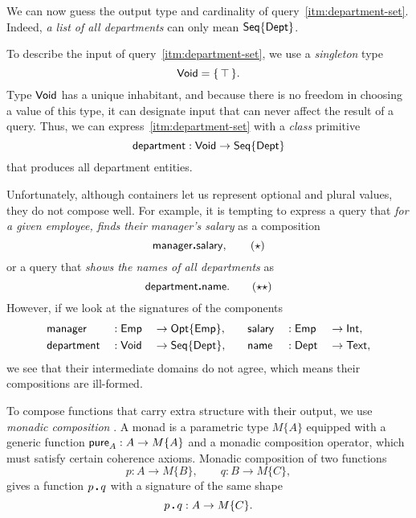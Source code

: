 We can now guess the output type and cardinality of
query~\ref{itm:department-set}.  Indeed, \emph{a list of all departments} can
only mean $\mathsf{Seq}{\left\{\mathsf{Dept}\right\}}$.

To describe the input of query~\ref{itm:department-set}, we use a
\emph{singleton} type
\begin{equation*}
    \mathsf{Void} = \{\, \top \,\}.
\end{equation*}
Type $\mathsf{Void}$ has a unique inhabitant, and because there is no freedom in
choosing a value of this type, it can designate input that can never affect the
result of a query.  Thus, we can express~\ref{itm:department-set} with a
\emph{class} primitive
\begin{equation*}
    \mathsf{department} : \mathsf{Void} \to \mathsf{Seq}{\left\{\mathsf{Dept}\right\}}
\end{equation*}
that produces all department entities.

Unfortunately, although containers let us represent optional and plural values,
they do not compose well.  For example, it is tempting to express a query that
\emph{for a given employee, finds their manager's salary} as a composition
\begin{equation} \label{eq:manager-to-salary}
    \mathsf{manager}\boldsymbol{.}\mathsf{salary}, \tag{$\star$}
\end{equation}
or a query that \emph{shows the names of all departments} as
\begin{equation} \label{eq:department-to-name}
    \mathsf{department}\boldsymbol{.}\mathsf{name}. \tag{$\star\star$}
\end{equation}
However, if we look at the signatures of the components
\begin{alignat*}{6}
    & \mathsf{manager} && : \mathsf{Emp} && \to \mathsf{Opt}{\left\{\mathsf{Emp}\right\}}, \quad && \mathsf{salary} && : \mathsf{Emp} && \to \mathsf{Int}, \\
    & \mathsf{department} && : \mathsf{Void} && \to \mathsf{Seq}{\left\{\mathsf{Dept}\right\}}, \quad && \mathsf{name} && : \mathsf{Dept} && \to \mathsf{Text},
\end{alignat*}
we see that their intermediate domains do not agree, which means their
compositions are ill-formed.

To compose functions that carry extra structure with their output, we use
\emph{monadic composition} \cite{Moggi1991}.  A mo\-nad is a parametric type
$M\{A\}$ equipped with a generic function $\mathsf{pure}_A : A \to M\{A\}$ and
a monadic composition operator, which must satisfy certain coherence axioms.
Monadic composition of two functions
\begin{equation*}
    p : A \to M\{B\}, \qquad q : B \to M\{C\},
\end{equation*}
gives a function $p\,\boldsymbol{.}\,q$ with a signature of the same shape
\begin{equation*}
    p\,\boldsymbol{.}\,q : A \to M\{C\}.
\end{equation*}

